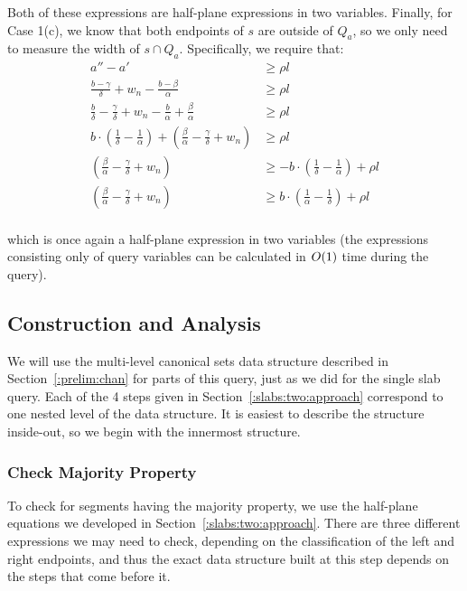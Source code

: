 \noindent Both of these expressions are half-plane expressions in two variables.  Finally, for Case 1(c), we know that both endpoints of $s$ are outside of $Q_a$, so we only need to measure the width of $s \cap Q_a$.  Specifically, we require that:
\[
\begin{split} 
a'' - a' &\geq \rho l \\
%
\frac{b - \gamma}{\delta} + w_n - \frac{b - \beta}{\alpha} &\geq \rho l \\
%
\frac{b}{\delta} - \frac{\gamma}{\delta} + w_n - \frac{b}{\alpha} + \frac{\beta}{\alpha} &\geq \rho l \\
%
b \cdot \left ( \frac{1}{\delta} - \frac{1}{\alpha} \right ) + \left ( \frac{\beta}{\alpha} - \frac{\gamma}{\delta} + w_n \right ) &\geq \rho l \\
%
\left ( \frac{\beta}{\alpha} - \frac{\gamma}{\delta} + w_n \right ) &\geq -b \cdot \left (\frac{1}{\delta} - \frac{1}{\alpha} \right ) + \rho l \\
%
\left ( \frac{\beta}{\alpha} - \frac{\gamma}{\delta} + w_n \right ) &\geq b \cdot \left (\frac{1}{\alpha} - \frac{1}{\delta} \right ) + \rho l \\
%
\end{split}
\]

\noindent
which is once again a half-plane expression in two variables (the expressions consisting only of query variables can be calculated in $O\!\left(1\right)$ time during the query).


\subsection{Construction and Analysis}
\label{:slabs:two:analysis}

We will use the multi-level canonical sets data structure described in Section~\ref{:prelim:chan} for parts of this query, just as we did for the single slab query.  Each of the 4 steps given in Section~\ref{:slabs:two:approach} correspond to one nested level of the data structure.  It is easiest to describe the structure inside-out, so we begin with the innermost structure.


\subsubsection{Check Majority Property}

To check for segments having the majority property, we use the half-plane equations we developed in Section~\ref{:slabs:two:approach}.  There are three different expressions we may need to check, depending on the classification of the left and right endpoints, and thus the exact data structure built at this step depends on the steps that come before it.  

